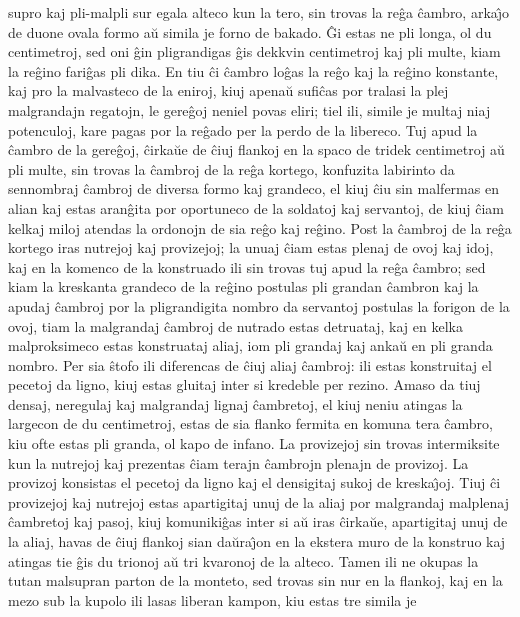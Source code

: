 supro kaj pli-malpli sur egala alteco kun la tero, sin trovas la
re\^ga \^cambro, arka\^{\j}o de duone ovala formo a\u u simila je
forno de bakado. \^Gi estas ne pli longa, ol du centimetroj, sed oni
\^gin pligrandigas \^gis dekkvin centimetroj kaj pli multe, kiam la
re\^gino fari\^gas pli dika. En tiu \^ci \^cambro lo\^gas la re\^go
kaj la re\^gino konstante, kaj pro la malvasteco de la eniroj, kiuj
apena\u u sufi\^cas por tralasi la plej malgrandajn regatojn, le
gere\^goj neniel povas eliri; tiel ili, simile je multaj niaj
potenculoj, kare pagas por la re\^gado per la perdo de la libereco.
Tuj apud la \^cambro de la gere\^goj, \^cirka\u ue de \^ciuj flankoj
en la spaco de tridek centimetroj a\u u pli multe, sin trovas la
\^cambroj de la re\^ga kortego, konfuzita labirinto da sennombraj
\^cambroj de diversa formo kaj grandeco, el kiuj \^ciu sin malfermas
en alian kaj estas aran\^gita por oportuneco de la soldatoj kaj
servantoj, de kiuj \^ciam kelkaj miloj atendas la ordonojn de sia
re\^go kaj re\^gino. Post la \^cambroj de la re\^ga kortego iras
nutrejoj kaj provizejoj; la unuaj \^ciam estas plenaj de ovoj kaj
idoj, kaj en la komenco de la konstruado ili sin trovas tuj apud la
re\^ga \^cambro; sed kiam la kreskanta grandeco de la re\^gino
postulas pli grandan \^cambron kaj la apudaj \^cambroj por la
pligrandigita nombro da servantoj postulas la forigon de la ovoj,
tiam la malgrandaj \^cambroj de nutrado estas detruataj, kaj en
kelka malproksimeco estas konstruataj aliaj, iom pli grandaj kaj
anka\u u en pli granda nombro. Per sia \^stofo ili diferencas de
\^ciuj aliaj \^cambroj: ili estas konstruitaj el pecetoj da ligno,
kiuj estas gluitaj inter si kredeble per rezino. Amaso da tiuj
densaj, neregulaj kaj malgrandaj lignaj \^cambretoj, el kiuj neniu
atingas la largecon de du centimetroj, estas de sia flanko fermita
en komuna tera \^cambro, kiu ofte estas pli granda, ol kapo de
infano. La provizejoj sin trovas intermiksite kun la nutrejoj kaj
prezentas \^ciam terajn \^cambrojn plenajn de provizoj. La provizoj
konsistas el pecetoj da ligno kaj el densigitaj sukoj de
kreska\^{\j}oj. Tiuj \^ci provizejoj kaj nutrejoj estas apartigitaj
unuj de la aliaj por malgrandaj malplenaj \^cambretoj kaj pasoj,
kiuj komuniki\^gas inter si a\u u iras \^cirka\u ue, apartigitaj
unuj de la aliaj, havas de \^ciuj flankoj sian da\u ura\^{\j}on en
la ekstera muro de la konstruo kaj atingas tie \^gis du trionoj a\u
u tri kvaronoj de la alteco. Tamen ili ne okupas la tutan malsupran
parton de la monteto, sed trovas sin nur en la flankoj, kaj en la
mezo sub la kupolo ili lasas liberan kampon, kiu estas tre simila je
